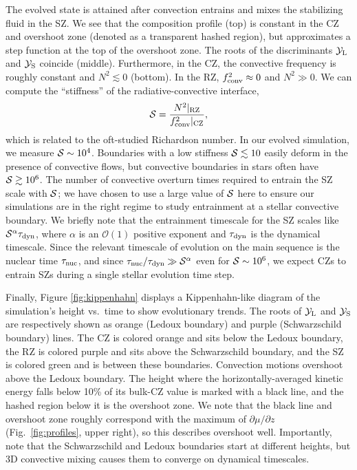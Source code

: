 The evolved state is attained after convection entrains and mixes the stabilizing fluid in the SZ.
We see that the composition profile (top) is constant in the CZ and overshoot zone (denoted as a transparent hashed region), but approximates a step function at the top of the overshoot zone.
The roots of the discriminants $\mathcal{Y}_{\rm{L}}$ and $\mathcal{Y}_{\rm{S}}$ coincide (middle).
Furthermore, in the CZ, the convective frequency is roughly constant and $N^2 \lesssim 0$ (bottom).
In the RZ, $f_{\rm{conv}}^2 \approx 0$ and $N^2 \gg 0$.
We can compute the ``stiffness'' of the radiative-convective interface,
\begin{equation}
\mS = \frac{N^2|_{\rm{RZ}}}{f_{\rm{conv}}^2|_{\rm{CZ}}},
\label{eqn:stiffness}
\end{equation}
which is related to the oft-studied Richardson number.
In our evolved simulation, we measure $\mathcal{S} \sim 10^{4}$.
Boundaries with a low stiffness $\mathcal{S} \lesssim 10$ easily deform in the presence of convective flows, but convective boundaries in stars often have $\mathcal{S} \gtrsim 10^6$.
The number of convective overturn times required to entrain the SZ scale with $\mathcal{S}$; we have chosen to use a large value of $\mathcal{S}$ here to ensure our simulations are in the right regime to study entrainment at a stellar convective boundary.
We briefly note that the entrainment timescale for the SZ scales like $\mathcal{S}^{\alpha}\tau_{\rm{dyn}}$, where $\alpha$ is an $\mathcal{O}(1)$ positive exponent and $\tau_{\rm{dyn}}$ is the dynamical timescale.
Since the relevant timescale of evolution on the main sequence is the nuclear time $\tau_{\rm{nuc}}$, and since $\tau_{\rm{nuc}}/\tau_{\rm{dyn}} \gg \mathcal{S}^{\alpha}$ even for $\mathcal{S} \sim 10^6$, we expect CZs to entrain SZs during a single stellar evolution time step.

Finally, Figure \ref{fig:kippenhahn} displays a Kippenhahn-like diagram of the simulation's height vs.~time to show evolutionary trends.
The roots of $\mathcal{Y}_{\rm{L}}$ and $\mathcal{Y}_{\rm{S}}$ are respectively shown as orange (Ledoux boundary) and purple (Schwarzschild boundary) lines.
The CZ is colored orange and sits below the Ledoux boundary, the RZ is colored purple and sits above the Schwarzschild boundary, and the SZ is colored green and is between these boundaries.
Convection motions overshoot above the Ledoux boundary.
The height where the horizontally-averaged kinetic energy falls below 10\% of its bulk-CZ value is marked with a black line, and the hashed region below it is the overshoot zone.
We note that the black line and overshoot zone roughly correspond with the maximum of $\partial\mu/\partial z$ (Fig.~\ref{fig:profiles}, upper right), so this describes overshoot well.
Importantly, note that the Schwarzschild and Ledoux boundaries start at different heights, but 3D convective mixing causes them to converge on dynamical timescales.


